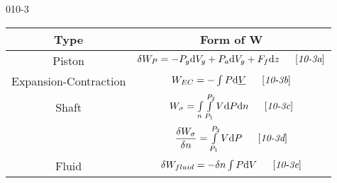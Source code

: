 \begin{mitframe}{010-3}


	\begin{longtable}{|c|c|}
	\hline
	Type & Form of W\\ \hline
    Piston & $\blthick\work_{\p}=-\p_{\grav}\mathrm{d}\vol_{\grav}+\p_{\activity}\mathrm{d}\vol_{\grav}+\force_{\fug}\mathrm{d}\heightz\tab\left[\textit{10-3a}\right]$ \\ \hline
    Expansion-Contraction & $\work_{EC}=-\int\p\mathrm{d}\uline{\vol}\tab\left[\textit{10-3b}\right]$ \\ \hline
   	Shaft & $\work_{\molecrad}=\int\limits_{n}\int\limits_{\p_{1}}^{\p_{2}}\vol\mathrm{d}\p\mathrm{d}n\tab\left[\textit{10-3c}\right]$ \\ 
& $\dfrac{\blthick\work_{\molecrad}}{\blthick n}=\int\limits_{\p_{1}}^{\p_{2}}\vol\mathrm{d}\p\tab\left[\textit{10-3d}\right]$ \\    \hline 
    Fluid & $\blthick\work_{fluid}=-\blthick n\int\p\mathrm{d}\vol\tab\left[\textit{10-3e}\right]$ \\ \hline
   
    \end{longtable}

\end{mitframe}